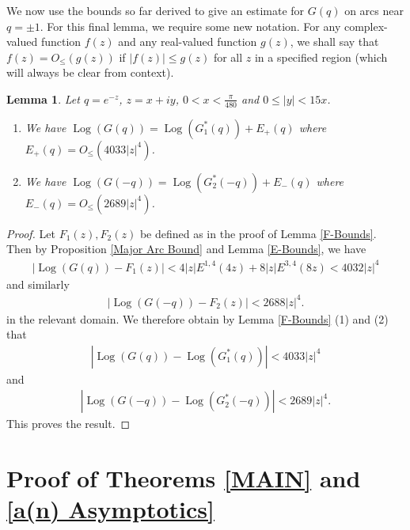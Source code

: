 \documentclass[11pt,reqno]{amsart}
\theoremstyle{definition}
\theoremstyle{plain}
\newtheorem{lemma}[theorem]{Lemma}
\theoremstyle{named}
\DeclareMathOperator\Log{Log}
\numberwithin{equation}{section}
\theoremstyle{example}
\def\lp{\left(}
\def\rp{\right)}
\begin{document}
We now use the bounds so far derived to give an estimate for $G(q)$ on arcs near $q = \pm 1$. For this final lemma, we require some new notation. For any complex-valued function $f(z)$ and any real-valued function $g(z)$, we shall say that $f(z) = O_{\leq}\lp g(z) \rp$ if $\left| f(z) \right| \leq g(z)$ for all $z$ in a specified region (which will always be clear from context).

\begin{lemma} \label{Major Error Bound}
Let $q = e^{-z}$, $z = x + iy$, $0 < x < \frac{\pi}{480}$ and $0 \leq |y| < 15x$.
\begin{enumerate}
    \item We have $\Log\lp G(q) \rp = \Log\lp G_1^*(q) \rp + E_+(q)$ where $E_+(q) = O_{\leq}\lp 4033 |z|^4 \rp$.
    \item We have $\Log\lp G(-q) \rp = \Log\lp G_2^*(-q) \rp + E_-(q)$ where $E_-(q) = O_{\leq}\lp 2689 |z|^4 \rp$.
\end{enumerate}
\end{lemma}

\begin{proof}
Let $F_1(z), F_2(z)$ be defined as in the proof of Lemma \ref{F-Bounds}. Then by Proposition \ref{Major Arc Bound} and Lemma \ref{E-Bounds},  we have
\begin{align*}
    \left| \Log\lp G(q) \rp - F_1(z) \right| < 4|z| E^{1,4}(4z) + 8|z| E^{3,4}(8z) < 4032 |z|^4
\end{align*}
and similarly
\begin{align*}
    \left| \Log\lp G(-q) \rp - F_2(z) \right| < 2688 |z|^4.
\end{align*}
in the relevant domain. We therefore obtain by Lemma \ref{F-Bounds} (1) and (2) that
\begin{align*}
    \left| \Log\lp G(q) \rp - \Log\lp G_1^*(q) \rp \right| < 4033 |z|^4
\end{align*}
and
\begin{align*}
    \left| \Log\lp G(-q) \rp - \Log\lp G_2^*(-q) \rp \right| < 2689 |z|^4.
\end{align*}
This proves the result.
\end{proof}

\section{Proof of Theorems \ref{MAIN} and \ref{a(n) Asymptotics}} \label{Proof of MAIN}
\end{document}

